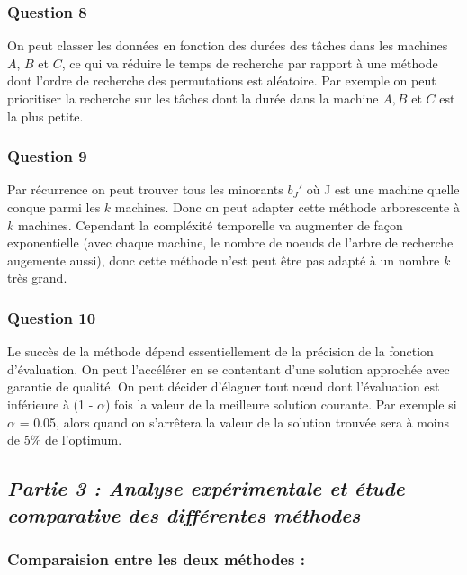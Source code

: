 \subsubsection{Question 8}\label{question-8}

On peut classer les données en fonction des durées des tâches dans les
machines \(A\), \(B\) et \(C\), ce qui va réduire le temps de recherche
par rapport à une méthode dont l'ordre de recherche des permutations est
aléatoire. Par exemple on peut prioritiser la recherche sur les tâches
dont la durée dans la machine \(A,B\) et \(C\) est la plus petite.

\subsubsection{Question 9}\label{question-9}

Par récurrence on peut trouver tous les minorants \(b_J'\) où J est une
machine quelle conque parmi les \(k\) machines. Donc on peut adapter
cette méthode arborescente à \(k\) machines. Cependant la compléxité
temporelle va augmenter de façon exponentielle (avec chaque machine, le
nombre de noeuds de l'arbre de recherche augemente aussi), donc cette
méthode n'est peut être pas adapté à un nombre \(k\) très grand.

\subsubsection{Question 10}\label{question-10}

Le succès de la méthode dépend essentiellement de la précision de la
fonction d'évaluation. On peut l'accélérer en se contentant d'une
solution approchée avec garantie de qualité. On peut décider d'élaguer
tout nœud dont l'évaluation est inférieure à (1 - \(\alpha\)) fois la
valeur de la meilleure solution courante. Par exemple si \(\alpha\) =
0.05, alors quand on s'arrêtera la valeur de la solution trouvée sera à
moins de 5\% de l'optimum.

\subsection{\texorpdfstring{\emph{Partie 3 : Analyse expérimentale et
étude comparative des différentes
méthodes}}{Partie 3 : Analyse expérimentale et étude comparative des différentes méthodes}}\label{partie-3-analyse-expuxe9rimentale-et-uxe9tude-comparative-des-diffuxe9rentes-muxe9thodes}

\subsubsection{Comparaision entre les deux méthodes
:}\label{comparaision-entre-les-deux-muxe9thodes}

